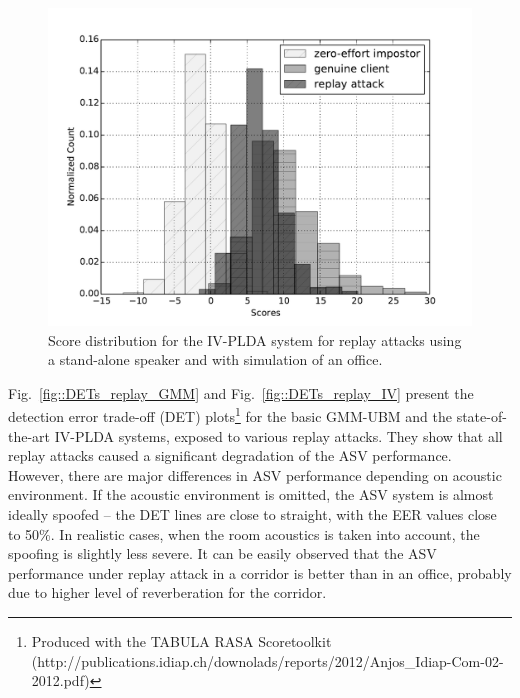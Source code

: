 \begin{figure}
	\centering
	\begin{minipage}{.5\textwidth}
	\includegraphics[width=1\linewidth]{Figs/dist_IV_off.pdf}
	\end{minipage}

%

	\caption{Score distribution for the IV-PLDA system for replay attacks using a stand-alone speaker and with simulation of an office.}
	\label{fig::Dist_IV}
\end{figure}

Fig.~\ref{fig::DETs_replay_GMM} and Fig.~\ref{fig::DETs_replay_IV} present the detection error trade-off (DET) plots\footnote{Produced with the TABULA RASA Scoretoolkit (http://publications.idiap.ch/downolads/reports/2012/Anjos\_Idiap-Com-02-2012.pdf)}  for the basic GMM-UBM and the state-of-the-art IV-PLDA systems, exposed to various replay attacks. They show that all replay attacks caused a significant degradation of the ASV performance. However, there are major differences in ASV performance depending on acoustic environment. If the acoustic environment is omitted, the ASV system is almost ideally spoofed -- the DET lines are close to straight, with the EER values close to 50\%. In realistic cases, when the room acoustics is taken into account, the spoofing is slightly less severe. It can be easily observed that the ASV performance under replay attack in a corridor is better than in an office, probably due to higher level of reverberation for the corridor. 

